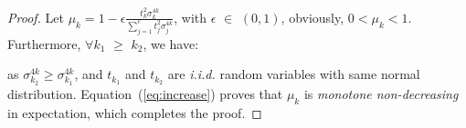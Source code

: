 \begin{proof}
Let {\small $\mu_k = 1 - \epsilon \frac{t_k^2\sigma_k^{4k}}{\sum_{j=1}^c t_j^2 \sigma_j^{4k}}$}, with {\small $\epsilon$ $\in$ $(0,1)$}, obviously, {\small $0<\mu_k<1$}. 
Furthermore, {\small $\forall k_1$ $\geq$ $k_2$}, we have:
\begin{sequation}
\label{eq:increase}
\end{sequation}%
as {\small $\sigma_{k_2}^{4k} \geq \sigma_{k_1}^{4k}$}, and $t_{k_1}$ and $t_{k_2}$ are \textit{i.i.d.} random variables with same normal distribution.
Equation~(\ref{eq:increase}) proves that {\small $\mu_k$} is \textit{monotone non-decreasing} in expectation, which completes the proof.
\end{proof}

